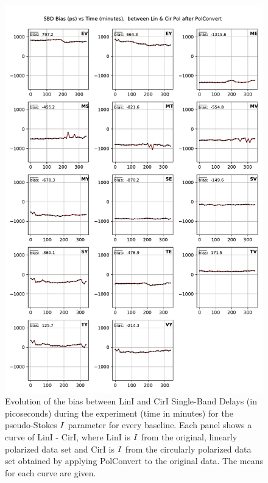 \documentclass[letterpaper,twoside,12pt]{article}
\begin{document}
\begin{figure}[ht!]
  \begin{center}
  \includegraphics[width=33pc]{SBD_bias_between_Lin_I_and_Cir_I.pdf}
  \caption{\small Evolution of the bias between LinI and CirI Single-Band Delays (in picoseconds) during the experiment (time in minutes) for the pseudo-Stokes $\protect I$ parameter for every baseline. Each panel shows a curve of LinI - CirI, where LinI is $\protect I$ from the original, linearly polarized data set and CirI is $\protect I$ from the circularly polarized data set obtained by applying PolConvert to the original data. The means for each curve are given.}
  \label{sbd_lin_cir_bias}
  \end{center}
\end{figure}
\end{document}
